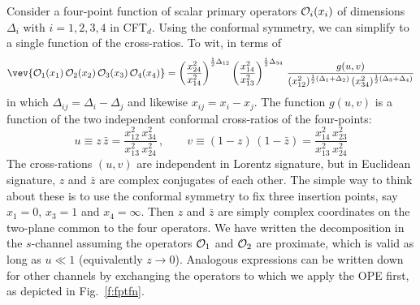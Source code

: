 \documentclass[12pt,openany]{book}
\begin{document}
Consider a four-point function of  scalar primary operators ${\cal O}_{i}(x_i)$ of dimensions $\Delta_i$ with $i=1,2,3,4$ in CFT$_d$. Using the conformal symmetry, we can simplify to a single function of the cross-ratios. To wit, in terms of
%
\begin{equation}
\vev{{\cal O}_1(x_1)\, {\cal O}_2(x_2)\,{\cal O}_3(x_3)\,{\cal O}_4(x_4)} = \left(\frac{x_{24}^2}{x_{14}^2}\right)^{\frac{1}{2} \Delta_{12}}
 \left(\frac{x_{14}^2}{x_{13}^2}\right)^{\frac{1}{2} \Delta_{34}} \,
\frac{g(u,v)}{(x_{12}^2)^{\frac{1}{2} (\Delta_1+\Delta_2)}   \, (x_{34}^2)^{\frac{1}{2} (\Delta_3+\Delta_4)}   }
\label{eq:genfpt}
\end{equation}
%
in which $\Delta_{ij} = \Delta_i-\Delta_j$ and likewise $x_{ij} = x_i - x_j $. The function $g(u,v)$ is a function of the two independent conformal cross-ratios of the four-points:
%
\begin{equation}
u \equiv z\, \bar{z} = \frac{x_{12}^2\, x_{34}^2}{x_{13}^2 \, x_{24}^2} \,, \qquad
v \equiv (1 -z)\, (1-\bar{z})= \frac{x_{14}^2\, x_{23}^2}{x_{13}^2\, x_{24}^2}
\label{eq:cratios}
\end{equation}
%
The cross-rations $(u,v)$ are independent in Lorentz signature, but in Euclidean signature, $z$ and $\bar{z}$ are complex conjugates of each other. The simple way to think about these is to use the conformal symmetry to fix three insertion points, say $x_1 =0$, $x_3=1$ and $x_4 = \infty$. Then $z$ and ${\bar z}$ are simply complex coordinates on the two-plane common to the four operators. We have written the decomposition in the $s$-channel assuming the operators ${\cal O}_1$ and ${\cal O}_2$ are proximate, which is valid as long as $u\ll1$ (equivalently $z\to 0$). Analogous expressions can be written down for other channels by exchanging the operators to which we apply  the OPE first, as depicted in Fig.~\ref{f:fptfn}.
\end{document}
